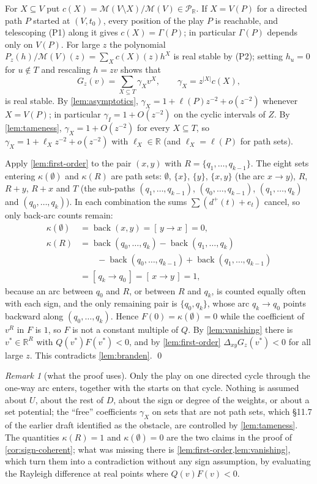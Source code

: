 \documentclass[11pt]{amsart}
\theoremstyle{plain}
\theoremstyle{definition}
\theoremstyle{remark}
\newtheorem{remark}[theorem]{Remark}
\numberwithin{equation}{section}
\newcommand{\RR}{\mathbb{R}}
\newcommand{\Puis}{\mathcal{P}_{\RR}}
\newcommand{\Mpot}{\mathcal{M}}           %
\newcommand{\back}{\operatorname{back}}
\begin{document}
For $X\subseteq V$ put $c(X)=\Mpot(V\setminus X)/\Mpot(V)\in\Puis$. If $X=V(P)$ for a directed path $P$ started at $(V,t_0)$, every position of the play $P$ is reachable, and telescoping \textup{(P1)} along it gives $c(X)=\Gamma(P)$; in particular $\Gamma(P)$ depends only on $V(P)$. For large $z$ the polynomial $P_z(h)/\Mpot(V)(z)=\sum_Xc(X)(z)h^X$ is real stable by \textup{(P2)}; setting $h_u=0$ for $u\notin T$ and rescaling $h=zv$ shows that
\[
G_z(v)=\sum_{X\subseteq T}\gamma_Xv^X,\qquad \gamma_X=z^{|X|}c(X),
\]
is real stable. By \cref{lem:asymptotics}, $\gamma_X=1+\ell(P)z^{-2}+o(z^{-2})$ whenever $X=V(P)$; in particular $\gamma_I=1+O(z^{-2})$ on the cyclic intervals of $Z$. By \cref{lem:tameness}, $\gamma_X=1+O(z^{-2})$ for every $X\subseteq T$, so $\gamma_X=1+\ell_Xz^{-2}+o(z^{-2})$ with $\ell_X\in\RR$ (and $\ell_X=\ell(P)$ for path sets).

Apply \cref{lem:first-order} to the pair $(x,y)$ with $R=\{q_1,\dots,q_{k-1}\}$. The eight sets entering $\kappa(\emptyset)$ and $\kappa(R)$ are path sets: $\emptyset$, $\{x\}$, $\{y\}$, $\{x,y\}$ (the arc $x\to y$), $R$, $R+y$, $R+x$ and $T$ (the sub-paths $(q_1,\dots,q_{k-1})$, $(q_0,\dots,q_{k-1})$, $(q_1,\dots,q_k)$ and $(q_0,\dots,q_k)$). In each combination the sums $\sum(d^{+}(t)+e_t)$ cancel, so only back-arc counts remain:
\begin{align*}
\kappa(\emptyset)&=\back(x,y)=[\,y\to x\,]=0,\\
\kappa(R)&=\back(q_0,\dots,q_k)-\back(q_1,\dots,q_k)\\
&\qquad-\back(q_0,\dots,q_{k-1})+\back(q_1,\dots,q_{k-1})\\
&=[\,q_k\to q_0\,]=[\,x\to y\,]=1,
\end{align*}
because an arc between $q_0$ and $R$, or between $R$ and $q_k$, is counted equally often with each sign, and the only remaining pair is $\{q_0,q_k\}$, whose arc $q_k\to q_0$ points backward along $(q_0,\dots,q_k)$. Hence $F(0)=\kappa(\emptyset)=0$ while the coefficient of $v^R$ in $F$ is $1$, so $F$ is not a constant multiple of $Q$. By \cref{lem:vanishing} there is $v^{*}\in\RR^R$ with $Q(v^{*})F(v^{*})<0$, and by \cref{lem:first-order} $\Delta_{xy}G_z(v^{*})<0$ for all large $z$. This contradicts \cref{lem:branden}. \qed

\begin{remark}[what the proof uses]\label{rem:locality}
Only the play on one directed cycle through the one-way arc enters, together with the starts on that cycle. Nothing is assumed about $U$, about the rest of $D$, about the sign or degree of the weights, or about a set potential; the ``free'' coefficients $\gamma_X$ on sets that are not path sets, which \S11.7 of the earlier draft identified as the obstacle, are controlled by \cref{lem:tameness}. The quantities $\kappa(R)=1$ and $\kappa(\emptyset)=0$ are the two claims in the proof of \cref{cor:sign-coherent}; what was missing there is \cref{lem:first-order,lem:vanishing}, which turn them into a contradiction without any sign assumption, by evaluating the Rayleigh difference at real points where $Q(v)F(v)<0$.
\end{remark}
\end{document}
